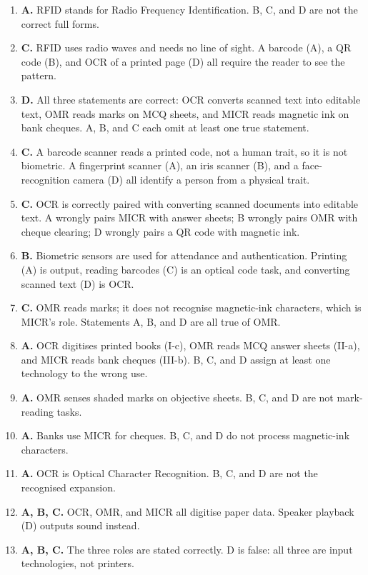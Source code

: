 \documentclass[11pt]{article}
\begin{document}
\begin{enumerate}[label=\textbf{Q\arabic*.}, leftmargin=*]
  barcode. A reverses both facts; C wrongly makes them equal and
  line-limited; D wrongly assigns magnetic ink to a QR code.
\item \textbf{A.} RFID stands for Radio Frequency Identification. B, C, and
  D are not the correct full forms.
\item \textbf{C.} RFID uses radio waves and needs no line of sight. A
  barcode (A), a QR code (B), and OCR of a printed page (D) all require the
  reader to see the pattern.
\item \textbf{D.} All three statements are correct: OCR converts scanned
  text into editable text, OMR reads marks on MCQ sheets, and MICR reads
  magnetic ink on bank cheques. A, B, and C each omit at least one true
  statement.
\item \textbf{C.} A barcode scanner reads a printed code, not a human
  trait, so it is not biometric. A fingerprint scanner (A), an iris scanner
  (B), and a face-recognition camera (D) all identify a person from a
  physical trait.
\item \textbf{C.} OCR is correctly paired with converting scanned documents
  into editable text. A wrongly pairs MICR with answer sheets; B wrongly
  pairs OMR with cheque clearing; D wrongly pairs a QR code with magnetic
  ink.
\item \textbf{B.} Biometric sensors are used for attendance and
  authentication. Printing (A) is output, reading barcodes (C) is an optical
  code task, and converting scanned text (D) is OCR.
\item \textbf{C.} OMR reads marks; it does not recognise magnetic-ink
  characters, which is MICR's role. Statements A, B, and D are all true of
  OMR.
\item \textbf{A.} OCR digitises printed books (I-c), OMR reads MCQ answer
  sheets (II-a), and MICR reads bank cheques (III-b). B, C, and D assign at
  least one technology to the wrong use.

\item \textbf{A.} OMR senses shaded marks on objective sheets. B, C, and D are not mark-reading tasks.
\item \textbf{A.} Banks use MICR for cheques. B, C, and D do not process magnetic-ink characters.
\item \textbf{A.} OCR is Optical Character Recognition. B, C, and D are not the recognised expansion.
\item \textbf{A, B, C.} OCR, OMR, and MICR all digitise paper data. Speaker playback (D) outputs sound instead.
\item \textbf{A, B, C.} The three roles are stated correctly. D is false: all three are input technologies, not printers.
\end{enumerate}
\def\JKSSBLessonID{13}\def\JKSSBAnswers{1}
\end{document}
